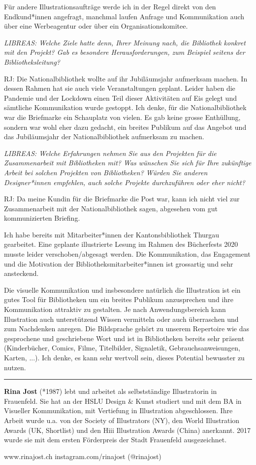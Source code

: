 \documentclass[a4paper,
fontsize=11pt,
oneside,
numbers=noperiodatend,
parskip=half-,
bibliography=totoc,
final
]{scrartcl}
\begin{document}
Für andere Illustrationsaufträge werde ich in der Regel direkt von den
Endkund*innen angefragt, manchmal laufen Anfrage und Kommunikation auch
über eine Werbeagentur oder über ein Organisationskomitee.

\emph{LIBREAS: Welche Ziele hatte denn, Ihrer Meinung nach, die
Bibliothek konkret mit den Projekt? Gab es besondere Herausforderungen,
zum Beispiel seitens der Bibliotheksleitung?}

RJ: Die Nationalbibliothek wollte auf ihr Jubiläumsjahr aufmerksam
machen. In dessen Rahmen hat sie auch viele Veranstaltungen geplant.
Leider haben die Pandemie und der Lockdown einen Teil dieser Aktivitäten
auf Eis gelegt und sämtliche Kommunikation wurde gestoppt. Ich denke,
für die Nationalbibliothek war die Briefmarke ein Schauplatz von vielen.
Es gab keine grosse Enthüllung, sondern war wohl eher dazu gedacht, ein
breites Publikum auf das Angebot und das Jubiläumsjahr der
Nationalbibliothek aufmerksam zu machen.

\emph{LIBREAS: Welche Erfahrungen nehmen Sie aus den Projekten für die
Zusammenarbeit mit Bibliotheken mit? Was wünschen Sie sich für Ihre
zukünftige Arbeit bei solchen Projekten von Bibliotheken? Würden Sie
anderen Designer*innen empfehlen, auch solche Projekte durchzuführen
oder eher nicht?}

RJ: Da meine Kundin für die Briefmarke die Post war, kann ich nicht viel
zur Zusammenarbeit mit der Nationalbibliothek sagen, abgesehen vom gut
kommunizierten Briefing.

Ich habe bereits mit Mitarbeiter*innen der Kantonsbibliothek Thurgau
gearbeitet. Eine geplante illustrierte Lesung im Rahmen des Bücherfests
2020 musste leider verschoben/abgesagt werden. Die Kommunikation, das
Engagement und die Motivation der Bibliotheksmitarbeiter*innen ist
grossartig und sehr ansteckend.

Die visuelle Kommunikation und insbesondere natürlich die Illustration
ist ein gutes Tool für Bibliotheken um ein breites Publikum anzusprechen
und ihre Kommunikation attraktiv zu gestalten. Je nach Anwendungsbereich
kann Illustration auch unterstützend Wissen vermitteln oder auch
überraschen und zum Nachdenken anregen. Die Bildsprache gehört zu
unserem Repertoire wie das gesprochene und geschriebene Wort und ist in
Bibliotheken bereits sehr präsent (Kinderbücher, Comics, Filme,
Titelbilder, Signaletik, Gebrauchsanweisungen, Karten, ...). Ich denke,
es kann sehr wertvoll sein, dieses Potential bewusster zu nutzen.

\begin{center}\rule{0.5\linewidth}{0.5pt}\end{center}

\textbf{Rina Jost} (*1987) lebt und
arbeitet als selbstständige Illustratorin in Frauenfeld. Sie hat an der
HSLU Design \& Kunst studiert und mit dem BA in Visueller Kommunikation,
mit Vertiefung in Illustration abgeschlossen. Ihre Arbeit wurde u.a. von
der Society of Illustrators (NY), den World Illustration Awards (UK,
Shortlist) und den Hiii Illustration Awards (China) anerkannt. 2017
wurde sie mit dem ersten Förderpreis der Stadt Frauenfeld ausgezeichnet.

www.rinajost.ch\newline
instagram.com/rinajost (@rinajost)
\end{document}
